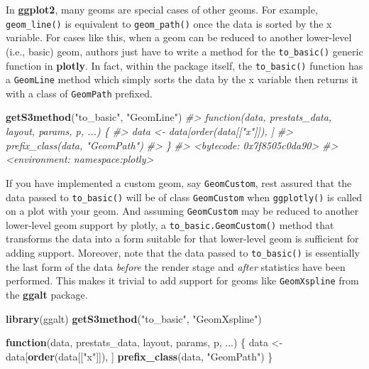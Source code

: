 \documentclass[
  12pt,
]{krantz}
\newenvironment{Shaded}{\begin{snugshade}}{\end{snugshade}}
\newcommand{\CommentTok}[1]{\textcolor[rgb]{0.56,0.35,0.01}{\textit{#1}}}
\newcommand{\ControlFlowTok}[1]{\textcolor[rgb]{0.13,0.29,0.53}{\textbf{#1}}}
\newcommand{\KeywordTok}[1]{\textcolor[rgb]{0.13,0.29,0.53}{\textbf{#1}}}
\newcommand{\NormalTok}[1]{#1}
\newcommand{\StringTok}[1]{\textcolor[rgb]{0.31,0.60,0.02}{#1}}
\begin{document}
In \textbf{ggplot2}, many geoms are special cases of other geoms. For example, \texttt{geom\_line()} is equivalent to \texttt{geom\_path()} once the data is sorted by the x variable. For cases like this, when a geom can be reduced to another lower-level (i.e., basic) geom, authors just have to write a method for the \texttt{to\_basic()} generic function in \textbf{plotly}. In fact, within the package itself, the \texttt{to\_basic()} function has a \texttt{GeomLine} method which simply sorts the data by the x variable then returns it with a class of \texttt{GeomPath} prefixed.

\begin{Shaded}
\begin{Highlighting}[]
\KeywordTok{getS3method}\NormalTok{(}\StringTok{"to_basic"}\NormalTok{, }\StringTok{"GeomLine"}\NormalTok{)}
\CommentTok{#> function(data, prestats_data, layout, params, p, ...) \{}
\CommentTok{#>   data <- data[order(data[["x"]]), ]}
\CommentTok{#>   prefix_class(data, "GeomPath")}
\CommentTok{#> \}}
\CommentTok{#> <bytecode: 0x7f8505c0da90>}
\CommentTok{#> <environment: namespace:plotly>}
\end{Highlighting}
\end{Shaded}

If you have implemented a custom geom, say \texttt{GeomCustom}, rest assured that the data passed to \texttt{to\_basic()} will be of class \texttt{GeomCustom} when \texttt{ggplotly()} is called on a plot with your geom. And assuming \texttt{GeomCustom} may be reduced to another lower-level geom support by plotly, a \texttt{to\_basic.GeomCustom()} method that transforms the data into a form suitable for that lower-level geom is sufficient for adding support. Moreover, note that the data passed to \texttt{to\_basic()} is essentially the last form of the data \emph{before} the render stage and \emph{after} statistics have been performed. This makes it trivial to add support for geoms like \texttt{GeomXspline} from the \textbf{ggalt} package.

\begin{Shaded}
\begin{Highlighting}[]
\KeywordTok{library}\NormalTok{(ggalt)}
\KeywordTok{getS3method}\NormalTok{(}\StringTok{"to_basic"}\NormalTok{, }\StringTok{"GeomXspline"}\NormalTok{)}
\end{Highlighting}
\end{Shaded}

\begin{Shaded}
\begin{Highlighting}[]
\ControlFlowTok{function}\NormalTok{(data, prestats_data, layout, params, p, ...) \{}
\NormalTok{  data <-}\StringTok{ }\NormalTok{data[}\KeywordTok{order}\NormalTok{(data[[}\StringTok{"x"}\NormalTok{]]), ]}
  \KeywordTok{prefix_class}\NormalTok{(data, }\StringTok{"GeomPath"}\NormalTok{)}
\NormalTok{\}}
\end{Highlighting}
\end{Shaded}
\end{document}
